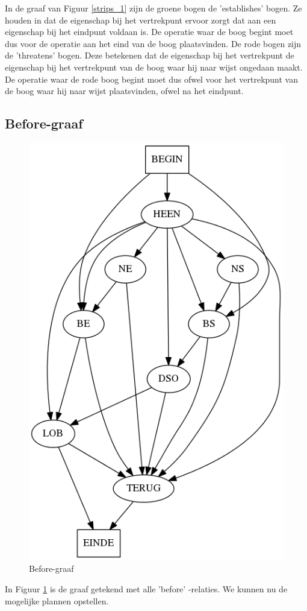 \documentclass[alternative-exam.tex]{subfiles}
\begin{document}
In de graaf van Figuur \ref{strips_1} zijn de groene bogen de 'establishes' bogen. Ze houden in dat de eigenschap bij het vertrekpunt ervoor zorgt dat aan een eigenschap bij het eindpunt voldaan is. De operatie waar de boog begint moet dus voor de operatie aan het eind van de boog plaatsvinden.
De rode bogen zijn de 'threatens' bogen. Deze betekenen dat de eigenschap bij het vertrekpunt de eigenschap bij het vertrekpunt van de boog waar hij naar wijst ongedaan maakt. De operatie waar de rode boog begint moet dus ofwel voor het vertrekpunt van de boog waar hij naar wijst plaatsvinden, ofwel na het eindpunt.
\subsection{Before-graaf}
\begin{figure}[H]
\centering
\caption{Before-graaf}
\label{strips_2}
\includegraphics[scale=0.3]{resources/graphs/strips_2.png}
\end{figure}
In Figuur \ref{strips_2} is de graaf getekend met alle 'before'
-relaties. We kunnen nu de mogelijke plannen opstellen. 
\end{document}
